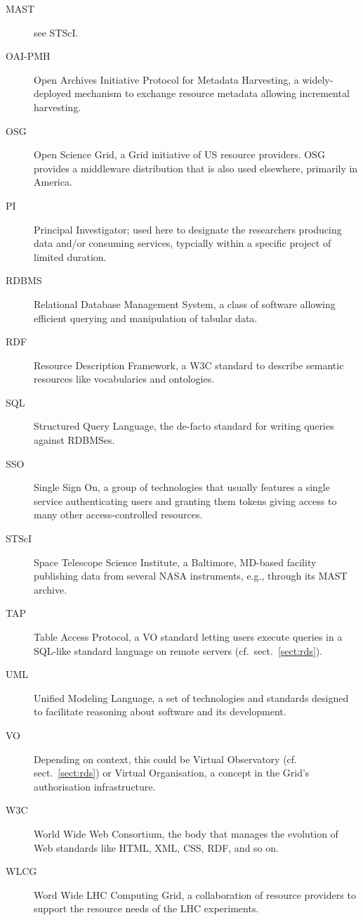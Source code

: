 \begin{description}
\item[MAST] see STScI.

\item[OAI-PMH] Open Archives Initiative Protocol for Metadata
Harvesting, a widely-deployed mechanism to exchange resource metadata
allowing incremental harvesting.

\item[OSG] Open Science Grid, a Grid initiative of US resource providers. OSG provides a middleware distribution that is also used elsewhere, primarily in America.

\item[PI] Principal Investigator; used here to designate the researchers
producing data and/or consuming services, typcially within a specific
project of limited duration.

\item[RDBMS] Relational Database Management System, a class of software
allowing efficient querying and manipulation of tabular data.

\item[RDF] Resource Description Framework, a W3C standard to describe
semantic resources like vocabularies and ontologies.

\item[SQL] Structured Query Language, the de-facto standard for writing
queries against RDBMSes.

\item[SSO] Single Sign On, a group of technologies that usually features
a single service authenticating users and granting them tokens giving
access to many other access-controlled resources.

\item[STScI] Space Telescope Science Institute, a Baltimore, MD-based
facility publishing data from several NASA instruments, e.g., through
its MAST archive.

\item[TAP] Table Access Protocol, a VO standard letting users execute
queries in a SQL-like standard language on remote servers
(cf.~sect.~\ref{sect:rds}).

\item[UML] Unified Modeling Language, a set of technologies and standards
designed to facilitate reasoning about software and its development.

\item[VO] Depending on context, this could be Virtual Observatory (cf.
sect.~\ref{sect:rds}) or Virtual Organisation, a concept in the Grid's
authorisation infrastructure.

\item[W3C] World Wide Web Consortium, the body that manages the
evolution of Web standards like HTML, XML, CSS, RDF, and so on.

\item[WLCG] Word Wide LHC Computing Grid, a collaboration of resource providers to support the resource needs of the LHC experiments.

\end{description}
